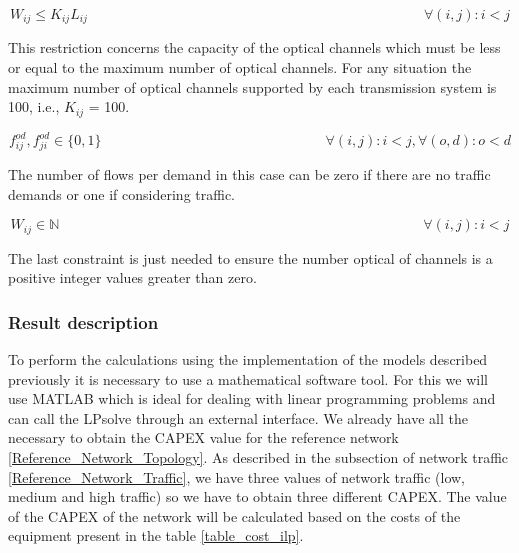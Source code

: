 \begin{equation}
W_{ij} \leq K_{ij} L_{ij} \qquad  \qquad \qquad \qquad \qquad \qquad \qquad \qquad \qquad \qquad \qquad \qquad \forall(i,j) : i < j
\label{ILPOpaque5_Surv}
\end{equation}

This restriction concerns the capacity of the optical channels which must be less or equal to the maximum number of optical channels. For any situation the maximum number of optical channels supported by each transmission system is 100, i.e., $K_{ij}$ = 100.

\begin{equation}
f_{ij}^{od} , f_{ji}^{od} \in \{0,1\}   \qquad \qquad \qquad \qquad \qquad \qquad \qquad \qquad
\forall(i,j) : i < j, \forall(o,d) : o < d
\label{ILPOpaque6_Surv}
\end{equation}

The number of flows per demand in this case can be zero if there are no traffic demands or one if considering traffic.

\begin{equation}
W_{ij} \in \mathbb{N}  \qquad \qquad \qquad \qquad \qquad \qquad \qquad \qquad \qquad \qquad \qquad \qquad \qquad
\forall(i,j) : i < j
\label{ILPOpaque7_Surv}
\end{equation}

The last constraint is just needed to ensure the number optical of channels is a positive integer values greater than zero.


\subsubsection{Result description}

To perform the calculations using the implementation of the models described previously it is necessary to use a mathematical software tool. For this we will use MATLAB which is ideal for dealing with linear programming problems and can call the LPsolve through an external interface.
We already have all the necessary to obtain the CAPEX value for the reference network \ref{Reference_Network_Topology}. As described in the subsection of network traffic \ref{Reference_Network_Traffic}, we have three values of network traffic (low, medium and high traffic) so we have to obtain three different CAPEX.
The value of the CAPEX of the network will be calculated based on the costs of the equipment present in the table \ref{table_cost_ilp}.\\


